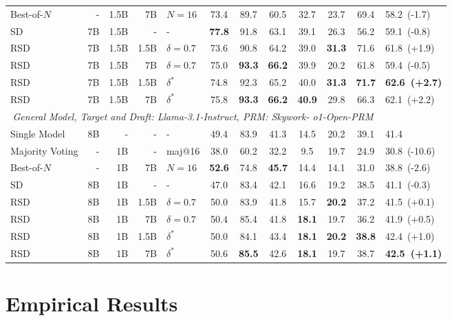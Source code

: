 \documentclass{article}
\theoremstyle{plain}
\theoremstyle{definition}
\theoremstyle{remark}
\begin{document}
\begin{table}[h!]
\begin{center}
\begin{tabular}{lrrrlccccccl}
Best-of-$N$ & - & 1.5B & 7B & $N=16$ & 73.4 & 89.7 & 60.5 & 32.7 & 23.7 & 69.4 & 58.2~(-1.7) \\
SD & 7B & 1.5B & - & - & \textbf{77.8} & 91.8 & 63.1 & 39.1 & 26.3 & 56.2 & 59.1~(-0.8) \\
\rowcolor{blue!8}
RSD & 7B & 1.5B & 1.5B & $\delta=0.7$ & 73.6 & 90.8 & 64.2 & 39.0 & \textbf{31.3} & 71.6 & 61.8~(+1.9) \\
\rowcolor{blue!8}
RSD & 7B & 1.5B & 7B & $\delta=0.7$ & 75.0 & \textbf{93.3} & \textbf{66.2} & 39.9 & 20.2 & 61.8 & 59.4~(-0.5) \\
\rowcolor{orange!8}
RSD & 7B & 1.5B & 1.5B & $\delta^*$ & 74.8 & 92.3 & 65.2 & 40.0 & \textbf{31.3} & \textbf{71.7} & \textbf{62.6~(+2.7)} \\
\rowcolor{orange!8}
RSD & 7B & 1.5B & 7B & $\delta^*$ & 75.8 & \textbf{93.3} & \textbf{66.2} & \textbf{40.9} & 29.8 & 66.3 & 62.1~(+2.2) \\
\midrule
\multicolumn{11}{c}{\textit{General Model, Target and Draft: Llama-3.1-Instruct, PRM: Skywork-
o1-Open-PRM}} \\
\midrule
Single Model & 8B & - & - & - & 49.4 & 83.9 & 41.3 & 14.5 & 20.2 & 39.1 & 41.4 \\
\cmidrule(lr){1-12}
Majority Voting & - & 1B & - & maj@16 & 38.0 & 60.2 & 32.2 & 9.5 & 19.7 & 24.9 & 30.8~(-10.6) \\
Best-of-$N$ & - & 1B & 7B & $N=16$ & \textbf{52.6} & 74.8 & \textbf{45.7} & 14.4 & 14.1 & 31.0 & 38.8~(-2.6) \\
SD & 8B & 1B & - & - & 47.0 & 83.4 & 42.1 & 16.6 & 19.2 & 38.5 & 41.1~(-0.3) \\
\rowcolor{blue!8}
RSD & 8B & 1B & 1.5B & $\delta=0.7$ & 50.0 & 83.9 & 41.8 & 15.7 & \textbf{20.2} & 37.2 & 41.5~(+0.1) \\
\rowcolor{blue!8}
RSD & 8B & 1B & 7B & $\delta=0.7$ & 50.4 & 85.4 & 41.8 & \textbf{18.1} & 19.7 & 36.2 & 41.9~(+0.5) \\
\rowcolor{orange!8}
RSD & 8B & 1B & 1.5B & $\delta^*$ & 50.0 & 84.1 & 43.4 & \textbf{18.1} & \textbf{20.2} & \textbf{38.8} & 42.4~(+1.0) \\
\rowcolor{orange!8}
RSD & 8B & 1B & 7B & $\delta^*$ & 50.6 & \textbf{85.5} & 42.6 & \textbf{18.1} & 19.7 & 38.7 & \textbf{42.5~(+1.1)} \\
\bottomrule
\end{tabular}
\end{center}
\vskip -0.2in
\end{table}

\section{Empirical Results} %
\end{document}
